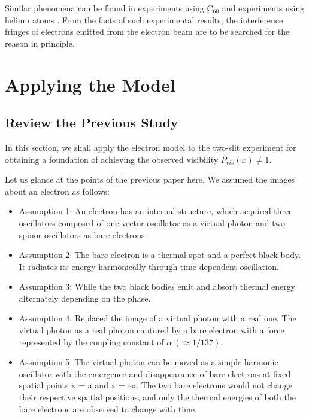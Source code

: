 \documentclass[%
 reprint,
 amsmath,amssymb,
 aps,
]{revtex4-1}
\numberwithin{equation}{section}%
\begin{document}
    Similar phenomena can be found in experiments using C$_{60}$ \cite{Arndt} and experiments using helium atoms \cite{Carnal}. From the facts of such experimental results, the interference fringes of electrons emitted from the electron beam are to be searched for the reason in principle.


\section{\label{sec:Applying_the_Model}Applying the Model}


\subsection{\label{sub:Review_the_Previous_Study}Review the Previous Study}


    In this section, we shall apply the electron model \cite{Hanamura} to the two-slit experiment for obtaining a foundation of achieving the observed visibility $P_{vis}(x) \neq 1$.

    Let us glance at the points of the previous paper here. We assumed the images about an electron as follows:

    \begin{itemize}
        \item Assumption 1: An electron has an internal structure, which acquired three oscillators composed of one vector oscillator as a virtual photon and two spinor oscillators as bare electrons.
        \item Assumption 2: The bare electron is a thermal spot and a perfect black body. It radiates its energy harmonically through time-dependent oscillation.
        \item Assumption 3: While the two black bodies emit and absorb thermal energy alternately depending on the phase.
        \item Assumption 4: Replaced the image of a virtual photon with a real one. The virtual photon as a real photon captured by a bare electron with a force represented by the coupling constant of $\alpha \ (\approx 1/137)$.
        \item Assumption 5: The virtual photon can be moved as a simple harmonic oscillator with the emergence and disappearance of bare electrons at fixed spatial points x = a and x = --a. The two bare electrons would not change their respective spatial positions, and only the thermal energies of both the bare electrons are observed to change with time.
    \end{itemize}
\end{document}
